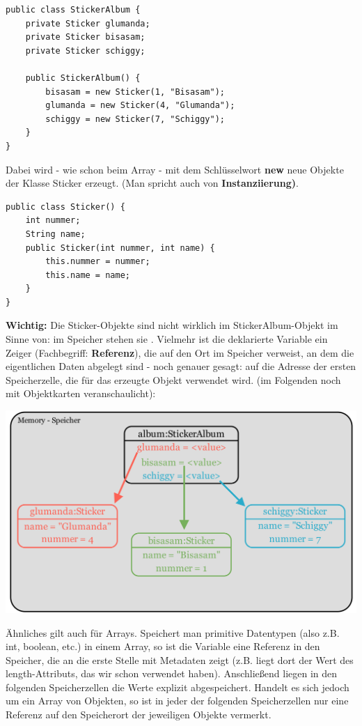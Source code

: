 \documentclass[fontsize=12pt]{article}
\begin{document}
\begin{verbatim}
public class StickerAlbum {
    private Sticker glumanda;
    private Sticker bisasam;
    private Sticker schiggy;

    public StickerAlbum() {
        bisasam = new Sticker(1, "Bisasam");
        glumanda = new Sticker(4, "Glumanda");
        schiggy = new Sticker(7, "Schiggy");
    }
}
\end{verbatim}
Dabei wird - wie schon beim Array - mit dem Schlüsselwort \textbf{new} neue Objekte der Klasse Sticker erzeugt. (Man spricht auch von \textbf{Instanziierung)}. \\
\begin{verbatim}
public class Sticker() {
    int nummer;
    String name;
    public Sticker(int nummer, int name) {
        this.nummer = nummer;
        this.name = name;
    }
}
\end{verbatim}
\vspace{2mm}
\textbf{Wichtig:} Die Sticker-Objekte sind nicht wirklich im StickerAlbum-Objekt  im Sinne von: im Speicher stehen sie . Vielmehr ist die deklarierte Variable ein Zeiger (Fachbegriff: \textbf{Referenz}), die auf den Ort im Speicher verweist, an dem die eigentlichen Daten abgelegt sind - noch genauer gesagt: auf die Adresse der ersten Speicherzelle, die für das erzeugte Objekt verwendet wird. (im Folgenden noch mit Objektkarten veranschaulicht): \\
\begin{center}
    \includegraphics[scale=0.15]{media/speicher_sticker.png}
\end{center}
Ähnliches gilt auch für Arrays. Speichert man primitive Datentypen (also z.B. int, boolean, etc.) in einem Array, so ist die Variable eine Referenz in den Speicher, die an die erste Stelle mit Metadaten zeigt (z.B. liegt dort der Wert des length-Attributs, das wir schon verwendet haben). Anschließend liegen in den folgenden Speicherzellen die Werte explizit abgespeichert. Handelt es sich jedoch um ein Array von Objekten, so ist in jeder der folgenden Speicherzellen nur eine Referenz auf den Speicherort der jeweiligen Objekte vermerkt.
\end{document}
